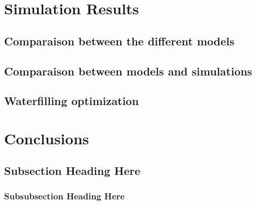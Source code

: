 \documentclass[journal,comsoc]{IEEEtran}
\let\MYoriglatexcaption\caption
\renewcommand{\caption}[2][\relax]{\MYoriglatexcaption[#2]{#2}}
\begin{document}
\section{Simulation Results}

\subsection{Comparaison between the different models}

\subsection{Comparaison between models and simulations}

\subsection{Waterfilling optimization}

\section{Conclusions}


\subsection{Subsection Heading Here}
\lipsum[1]

\subsubsection{Subsubsection Heading Here}

\lipsum[1]







\end{document}
